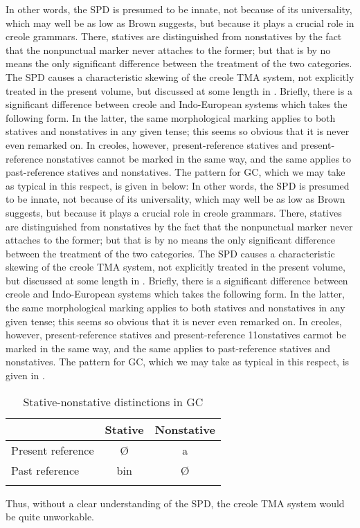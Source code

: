 In other words, the SPD is presumed to be innate, not because of its universality, which may well be as low as Brown suggests, but because it plays a crucial role in creole grammars. There, statives are distinguished from nonstatives by the fact that the nonpunctual marker never attaches to the former; but that is by no means the only signifi\-cant difference between the treatment of the two categories. The SPD causes a characteristic skewing of the creole TMA system, not explicitly treated in the present volume, but discussed at some length in \citet[Chapter 2]{Bickerton1975}. Briefly, there is a significant difference between creole and Indo-European systems which takes the following form. In the latter, the same morphological marking applies to both statives and nonstatives in any given tense; this seems so obvious that it is never even remarked on. In creoles, however, present-reference statives and present-reference nonstatives cannot be marked in the same way, and the same applies to past-reference statives and nonstatives. The pattern for GC, which we may take as typical in this respect, is given in  below:
In other words, the SPD is presumed to be innate, not because of its universality, which may well be as low as Brown suggests, but because it plays a crucial role in creole grammars. There, statives are distinguished from nonstatives by the fact that the nonpunctual marker never attaches to the former; but that is by no means the only signifi\-cant difference between the treatment of the two categories. The SPD causes a characteristic skewing of the creole TMA system, not explicitly treated in the present volume, but discussed at some length in \citet[Chapter 2]{Bickerton1975}. Briefly, there is a significant difference between creole and Indo-European systems which takes the following form. In the latter, the same morphological marking applies to both statives and nonstatives in any given tense; this seems so obvious that it is never even remarked on. In creoles, however, present-reference statives and present-reference 11onstatives carmot be marked in the same way, and the same applies to past-reference statives and nonstatives. The pattern for GC, which we may take as typical in this respect, is given in . %

\begin{table}
	\begin{tabular}{lcc}
	\lsptoprule
	& Stative & Nonstative \\
	\midrule
	Present reference & \O & a\\
	Past reference & bin & \O\\
	\lspbottomrule
	\end{tabular}
	\caption{Stative-nonstative distinctions in GC}\label{tab:3.1}
\end{table}
Thus, without a clear understanding of the SPD, the creole TMA system would be quite unworkable.

